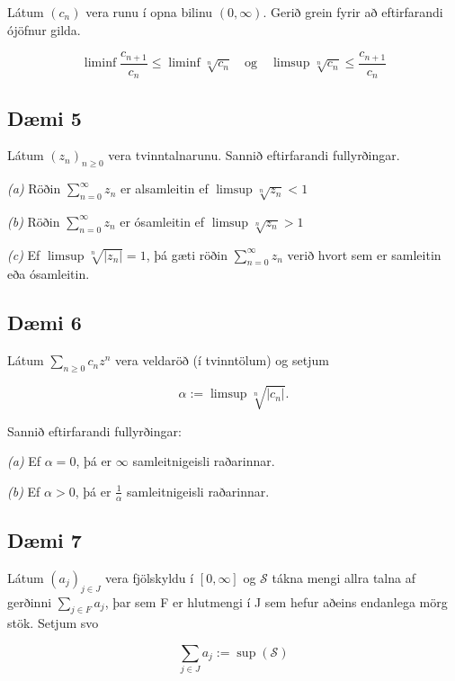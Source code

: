 \documentclass[]{book}
\begin{document}
Látum \((c_n)\) vera runu í opna bilinu \((0, \infty)\). Gerið grein fyrir að eftirfarandi ójöfnur gilda.

\[
\liminf\frac{c_{n+1}}{c_n} \leq \liminf\sqrt[n]{c_n} \quad \text{og} \quad \limsup\sqrt[n]{c_n} \leq \frac{c_{n+1}}{c_n}
\]

\hypertarget{dmi-5}{%
\subsection*{Dæmi 5}\label{dmi-5}}

Látum \((z_n)_{n\geq0}\) vera tvinntalnarunu. Sannið eftirfarandi fullyrðingar.

\emph{(a)} Röðin \(\sum_{n=0}^\infty z_n\) er alsamleitin ef \(\limsup\sqrt[n]{z_n} < 1\)

\emph{(b)} Röðin \(\sum_{n=0}^\infty z_n\) er ósamleitin ef \(\limsup\sqrt[n]{z_n} > 1\)

\emph{(c)} Ef \(\limsup\sqrt[n]{|z_n|} = 1\), þá gæti röðin \(\sum_{n=0}^\infty z_n\) verið hvort sem er samleitin eða ósamleitin.

\hypertarget{dmi-6}{%
\subsection*{Dæmi 6}\label{dmi-6}}

Látum \(\sum_{n\geq0} c_nz^n\) vera veldaröð (í tvinntölum) og setjum

\[
\alpha := \limsup \sqrt[n]{|c_n|}.
\]

Sannið eftirfarandi fullyrðingar:

\emph{(a)} Ef \(\alpha = 0\), þá er \(\infty\) samleitnigeisli raðarinnar.

\emph{(b)} Ef \(\alpha > 0\), þá er \(\frac1\alpha\) samleitnigeisli raðarinnar.

\hypertarget{dmi-7}{%
\subsection*{Dæmi 7}\label{dmi-7}}

Látum \((a_j)_{j\in J}\) vera fjölskyldu í \([0, \infty]\) og \(\mathcal S\) tákna mengi allra talna af gerðinni \(\sum_{j\in F} a_j\), þar sem F er hlutmengi í J sem hefur aðeins endanlega mörg stök. Setjum svo

\[
\sum_{j\in J}a_j := \sup(\mathcal S)
\]
\end{document}
